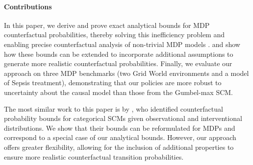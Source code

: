 \paragraph{Contributions} In this paper, we derive and prove exact analytical bounds for MDP counterfactual probabilities, thereby solving this inefficiency problem and enabling precise counterfactual analysis of non-trivial MDP models .  and show how these bounds can be extended to incorporate additional assumptions to generate more realistic counterfactual probabilities.  Finally, we evaluate our approach on three MDP benchmarks (two Grid World environments and a model of Sepsis treatment), demonstrating that our policies are more robust to uncertainty about the causal model than those from the Gumbel-max SCM. 

The most similar work to this paper is by \citet{li2024probabilities}, who identified counterfactual probability bounds for categorical SCMs given observational and interventional distributions. 
We show that their bounds can be reformulated for MDPs and correspond to a special case of our analytical bounds. However, our approach offers greater flexibility, allowing for the inclusion of additional properties to ensure more realistic counterfactual transition probabilities.
